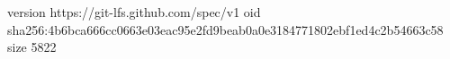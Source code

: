 version https://git-lfs.github.com/spec/v1
oid sha256:4b6bca666cc0663e03eac95e2fd9beab0a0e3184771802ebf1ed4c2b54663c58
size 5822
